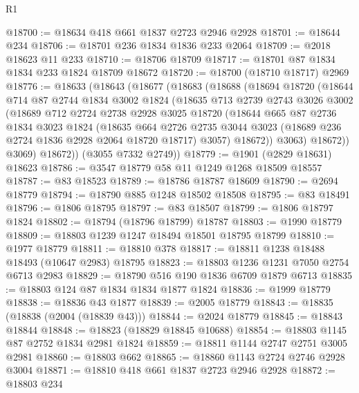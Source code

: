 \begin{lexlean}{R1}
\begin{coremodule}
@18700 := @18634 @418 @661 @1837 @2723 @2946 @2928
@18701 := @18644 @234
@18706 := @18701 @236 @1834 @1836 @233 @2064
@18709 := @2018 @18623 @11 @233
@18710 := @18706 @18709
@18717 := @18701 @87 @1834 @1834 @233 @1824 @18709 @18672
@18720 := @18700 (@18710 @18717) @2969
@18776 := @18633
    (@18643
      (@18677
        (@18683
          (@18688
            (@18694
              @18720
              (@18644
                @714
                @87
                @2744
                @1834
                @3002
                @1824
                (@18635
                  @713
                  @2739
                  @2743
                  @3026
                  @3002
                  (@18689
                    @712
                    @2724
                    @2738
                    @2928
                    @3025
                    @18720
                    (@18644
                      @665
                      @87
                      @2736
                      @1834
                      @3023
                      @1824
                      (@18635
                        @664
                        @2726
                        @2735
                        @3044
                        @3023
                        (@18689 @236 @2724 @1836 @2928 @2064 @18720 @18717)
                        @3057)
                      @18672))
                  @3063)
                @18672))
            @3069)
          @18672))
      (@3055 @7332 @2749))
@18779 := @1901 (@2829 @18631) @18623
@18786 := @3547 @18779 @58 @11 @1249 @1268 @18509 @18557
@18787 := @83 @18523
@18789 := @18786 @18787 @18609
@18790 := @2694 @18779
@18794 := @18790 @885 @1248 @18502 @18508
@18795 := @83 @18491
@18796 := @1806 @18795
@18797 := @83 @18507
@18799 := @1806 @18797 @1824
@18802 := @18794 (@18796 @18799) @18787
@18803 := @1990 @18779
@18809 := @18803 @1239 @1247 @18494 @18501 @18795 @18799
@18810 := @1977 @18779
@18811 := @18810 @378
@18817 := @18811 @1238 @18488 @18493 (@10647 @2983) @18795
@18823 := @18803 @1236 @1231 @7050 @2754 @6713 @2983
@18829 := @18790 @516 @190 @1836 @6709 @1879 @6713
@18835 := @18803 @124 @87 @1834 @1834 @1877 @1824
@18836 := @1999 @18779
@18838 := @18836 @43 @1877
@18839 := @2005 @18779
@18843 := @18835 (@18838 (@2004 (@18839 @43)))
@18844 := @2024 @18779
@18845 := @18843 @18844
@18848 := @18823 (@18829 @18845 @10688)
@18854 := @18803 @1145 @87 @2752 @1834 @2981 @1824
@18859 := @18811 @1144 @2747 @2751 @3005 @2981
@18860 := @18803 @662
@18865 := @18860 @1143 @2724 @2746 @2928 @3004
@18871 := @18810 @418 @661 @1837 @2723 @2946 @2928
@18872 := @18803 @234

\end{coremodule}
\end{lexlean}
